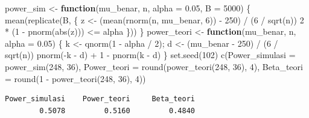 \documentclass[
  indonesian,
  letterpaper,
]{book}
\newenvironment{Shaded}{\begin{snugshade}}{\end{snugshade}}
\newcommand{\AttributeTok}[1]{\textcolor[rgb]{0.40,0.45,0.13}{#1}}
\newcommand{\ControlFlowTok}[1]{\textcolor[rgb]{0.00,0.23,0.31}{\textbf{#1}}}
\newcommand{\DecValTok}[1]{\textcolor[rgb]{0.68,0.00,0.00}{#1}}
\newcommand{\FloatTok}[1]{\textcolor[rgb]{0.68,0.00,0.00}{#1}}
\newcommand{\FunctionTok}[1]{\textcolor[rgb]{0.28,0.35,0.67}{#1}}
\newcommand{\NormalTok}[1]{\textcolor[rgb]{0.00,0.23,0.31}{#1}}
\newcommand{\OtherTok}[1]{\textcolor[rgb]{0.00,0.23,0.31}{#1}}
\newcommand{\SpecialCharTok}[1]{\textcolor[rgb]{0.37,0.37,0.37}{#1}}
\begin{document}
\begin{Shaded}
\begin{Highlighting}[]
\NormalTok{power\_sim }\OtherTok{\textless{}{-}} \ControlFlowTok{function}\NormalTok{(mu\_benar, n, }\AttributeTok{alpha =} \FloatTok{0.05}\NormalTok{, }\AttributeTok{B =} \DecValTok{5000}\NormalTok{) \{}
\FunctionTok{mean}\NormalTok{(}\FunctionTok{replicate}\NormalTok{(B, \{}
\NormalTok{z }\OtherTok{\textless{}{-}}\NormalTok{ (}\FunctionTok{mean}\NormalTok{(}\FunctionTok{rnorm}\NormalTok{(n, mu\_benar, }\DecValTok{6}\NormalTok{)) }\SpecialCharTok{{-}} \DecValTok{250}\NormalTok{) }\SpecialCharTok{/}\NormalTok{ (}\DecValTok{6} \SpecialCharTok{/} \FunctionTok{sqrt}\NormalTok{(n))}
\DecValTok{2} \SpecialCharTok{*}\NormalTok{ (}\DecValTok{1} \SpecialCharTok{{-}} \FunctionTok{pnorm}\NormalTok{(}\FunctionTok{abs}\NormalTok{(z))) }\SpecialCharTok{\textless{}=}\NormalTok{ alpha}
\NormalTok{\}))}
\NormalTok{\}}
\NormalTok{power\_teori }\OtherTok{\textless{}{-}} \ControlFlowTok{function}\NormalTok{(mu\_benar, n, }\AttributeTok{alpha =} \FloatTok{0.05}\NormalTok{) \{}
\NormalTok{k }\OtherTok{\textless{}{-}} \FunctionTok{qnorm}\NormalTok{(}\DecValTok{1} \SpecialCharTok{{-}}\NormalTok{ alpha }\SpecialCharTok{/} \DecValTok{2}\NormalTok{); d }\OtherTok{\textless{}{-}}\NormalTok{ (mu\_benar }\SpecialCharTok{{-}} \DecValTok{250}\NormalTok{) }\SpecialCharTok{/}\NormalTok{ (}\DecValTok{6} \SpecialCharTok{/} \FunctionTok{sqrt}\NormalTok{(n))}
\FunctionTok{pnorm}\NormalTok{(}\SpecialCharTok{{-}}\NormalTok{k }\SpecialCharTok{{-}}\NormalTok{ d) }\SpecialCharTok{+} \DecValTok{1} \SpecialCharTok{{-}} \FunctionTok{pnorm}\NormalTok{(k }\SpecialCharTok{{-}}\NormalTok{ d)}
\NormalTok{\}}
\FunctionTok{set.seed}\NormalTok{(}\DecValTok{102}\NormalTok{)}
\FunctionTok{c}\NormalTok{(}\AttributeTok{Power\_simulasi =} \FunctionTok{power\_sim}\NormalTok{(}\DecValTok{248}\NormalTok{, }\DecValTok{36}\NormalTok{), }\AttributeTok{Power\_teori =} \FunctionTok{round}\NormalTok{(}\FunctionTok{power\_teori}\NormalTok{(}\DecValTok{248}\NormalTok{, }\DecValTok{36}\NormalTok{),}
\DecValTok{4}\NormalTok{),}
\AttributeTok{Beta\_teori =} \FunctionTok{round}\NormalTok{(}\DecValTok{1} \SpecialCharTok{{-}} \FunctionTok{power\_teori}\NormalTok{(}\DecValTok{248}\NormalTok{, }\DecValTok{36}\NormalTok{), }\DecValTok{4}\NormalTok{))}
\end{Highlighting}
\end{Shaded}

\begin{verbatim}
Power_simulasi    Power_teori     Beta_teori 
        0.5078         0.5160         0.4840 
\end{verbatim}
\end{document}
